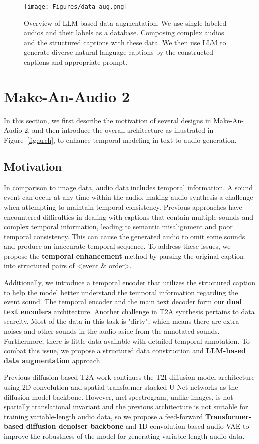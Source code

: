 \documentclass{article}
\begin{document}
\begin{figure*}[!t]
    \centering
    \texttt{[image: Figures/data\_aug.png]}
    \caption{Overview of LLM-based data augmentation. We use single-labeled audios and their labels as a database. Composing complex audios and the structured captions with these data. We then use LLM to generate diverse natural language captions by the constructed captions and appropriate prompt.} 
    \label{fig:data_aug}
\end{figure*} \section{Make-An-Audio 2}
In this section, we first describe the motivation of several designs in Make-An-Audio 2, and then introduce the overall architecture as illustrated in Figure~\ref{fig:arch}, to enhance temporal modeling in text-to-audio generation. 


\subsection{Motivation}
In comparison to image data, audio data includes temporal information. A sound event can occur at any time within the audio, making audio synthesis a challenge when attempting to maintain temporal consistency. Previous approaches have encountered difficulties in dealing with captions that contain multiple sounds and complex temporal information, leading to semantic misalignment and poor temporal consistency. This can cause the generated audio to omit some sounds and produce an inaccurate temporal sequence. To address these issues, we propose the \textbf{temporal enhancement} method by parsing the original caption into structured pairs of <event \& order>. 

Additionally, we introduce a temporal encoder that utilizes the structured caption to help the model better understand the temporal information regarding the event sound. The temporal encoder and the main text decoder form our \textbf{dual text encoders} architecture.
Another challenge in T2A synthesis pertains to data scarcity. Most of the data in this task is "dirty", which means there are extra noises and other sounds in the audio aside from the annotated sounds. Furthermore, there is little data available with detailed temporal annotation. To combat this issue, we propose a structured data construction and \textbf{LLM-based data augmentation} approach. 

Previous diffusion-based T2A work continues the T2I diffusion model architecture using 2D-convolution and spatial transformer stacked U-Net networks as the diffusion model backbone. However, mel-spectrogram, unlike images, is not spatially translational invariant and the previous architecture is not suitable for training variable-length audio data, so we propose a feed-forward \textbf{Transformer-based diffusion denoiser backbone} and 1D-convolution-based audio VAE to improve the robustness of the model for generating variable-length audio data.
\end{document}
